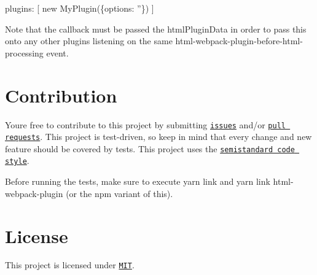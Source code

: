 \begin{DoxyCode}
plugins: [
  new MyPlugin(\{options: ''\})
]
\end{DoxyCode}


Note that the callback must be passed the html\+Plugin\+Data in order to pass this onto any other plugins listening on the same {\ttfamily html-\/webpack-\/plugin-\/before-\/html-\/processing} event.

\section*{Contribution}

You\textquotesingle{}re free to contribute to this project by submitting \href{https://github.com/jantimon/html-webpack-plugin/issues}{\tt issues} and/or \href{https://github.com/jantimon/html-webpack-plugin/pulls}{\tt pull requests}. This project is test-\/driven, so keep in mind that every change and new feature should be covered by tests. This project uses the \href{https://github.com/Flet/semistandard}{\tt semistandard code style}.

Before running the tests, make sure to execute {\ttfamily yarn link} and {\ttfamily yarn link html-\/webpack-\/plugin} (or the npm variant of this).

\section*{License}

This project is licensed under \href{https://github.com/jantimon/html-webpack-plugin/blob/master/LICENSE}{\tt M\+IT}. 